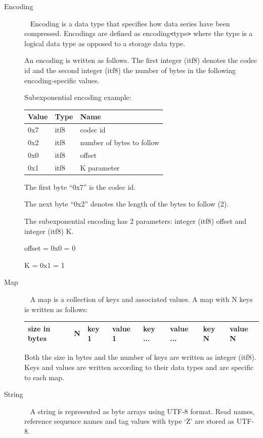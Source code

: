 \documentclass[a4paper]{article}
\begin{document}
\begin{description}
\item[{Encoding}]\ \newline
Encoding is a data type that specifies how data series have been compressed. Encodings 
are defined as encoding\texttt{<}type\texttt{>} where the type is a logical data 
type as opposed to a storage data type.

An encoding is written as follows. The first integer (itf8) denotes the codec id 
and the second integer (itf8) the number of bytes in the following encoding-specific 
values. 

Subexponential encoding example: 

\begin{tabular}{|l|l|l|}
\hline
\textbf{Value} & \textbf{Type} & \textbf{Name}\tabularnewline
\hline
0x7 & itf8 & codec id\tabularnewline
\hline
0x2 & itf8 & number of bytes to follow\tabularnewline
\hline
0x0 & itf8 & offset\tabularnewline
\hline
0x1 & itf8 & K parameter\tabularnewline
\hline
\end{tabular}

The first byte ``0x7'' is the codec id. 

The next byte ``0x2'' denotes the length of the bytes to follow (2). 

The subexponential encoding has 2 parameters: integer (itf8) offset and integer (itf8) K.

offset = 0x0 = 0

K = 0x1 = 1


\item[{Map}]\ \newline
A map is a collection of keys and associated values. A map with N keys is written 
as follows: 

\begin{tabular}{|l|l|l|l|l|l|l|l|}
\hline
size in bytes & N & key 1 & value 1 & key ... & value ... & key N & value N\tabularnewline
\hline
\end{tabular}

Both the size in bytes and the number of keys are written as integer (itf8). Keys 
and values are written according to their data types and are specific to each map.

\item[String]\ \newline
A string is represented as byte arrays using UTF-8 format. Read names, reference 
sequence names and tag values with type `Z' are stored as UTF-8.

\end{description}
\end{document}
